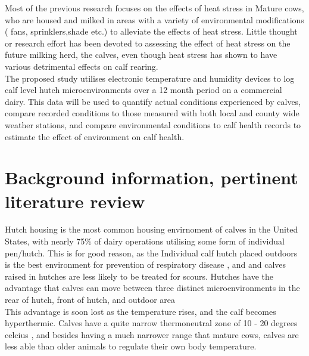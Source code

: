 \documentclass[12pt]{article}
\begin{document}
	Most of the previous research focuses on the effects of heat stress in Mature cows, who are housed and milked in areas with a variety of environmental modifications ( fans, sprinklers,shade etc.)  to alleviate the effects of heat stress.\cite{Armstrong1994}
	Little thought or research effort has been devoted to assessing the effect of heat stress on the future milking herd, the calves, even though heat stress has shown to have various detrimental effects on calf rearing. \cite{Stott1976,lacetera1994}\\


	The proposed study utilises electronic temperature and humidity devices to log calf level hutch microenvironments over a 12 month period on a commercial dairy. This data will be used to quantify actual conditions experienced by calves, compare recorded conditions to those measured with both local and county wide weather stations, and compare environmental conditions to calf health records to estimate the effect of environment on calf health. 

	\newpage
	\section{Background information, pertinent literature review}
	Hutch housing is the most common housing envirnoment of calves in the United States, with nearly 75\% of dairy operations utilising some form of individual pen/hutch.\cite{NAHMS2007}
	This is for good reason, as the Individual calf hutch placed outdoors is the best environment for prevention of respiratory disease \cite{callan2002biosecurity}, and and calves raised in hutches are less likely to be treated for scours. \cite{Waltner-Toews1986}
	Hutches have the advantage that calves can move between three distinct microenvironments in the rear of hutch, front of hutch, and outdoor area ~\cite{brunsvold1985} \\
	This advantage is soon lost as the temperature rises, and the calf becomes hyperthermic. Calves have a quite narrow thermoneutral zone of 10 - 20 degrees celcius \cite{Gebremedhin1981}, and besides having a much narrower range that mature cows, calves are less able than older animals to regulate their own body temperature.\cite{Christopherson1976}\\
\end{document}
